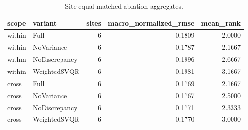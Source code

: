 \begin{table}
\caption{Site-equal matched-ablation aggregates.}
\label{tab:matched_ablation_aggregate}
\begin{tabular}{llrrr}
\toprule
scope & variant & sites & macro\_normalized\_rmse & mean\_rank \\
\midrule
within & Full & 6 & 0.1809 & 2.0000 \\
within & NoVariance & 6 & 0.1787 & 2.1667 \\
within & NoDiscrepancy & 6 & 0.1996 & 2.6667 \\
within & WeightedSVQR & 6 & 0.1981 & 3.1667 \\
cross & Full & 6 & 0.1769 & 2.1667 \\
cross & NoVariance & 6 & 0.1767 & 2.5000 \\
cross & NoDiscrepancy & 6 & 0.1771 & 2.3333 \\
cross & WeightedSVQR & 6 & 0.1770 & 3.0000 \\
\bottomrule
\end{tabular}
\end{table}
